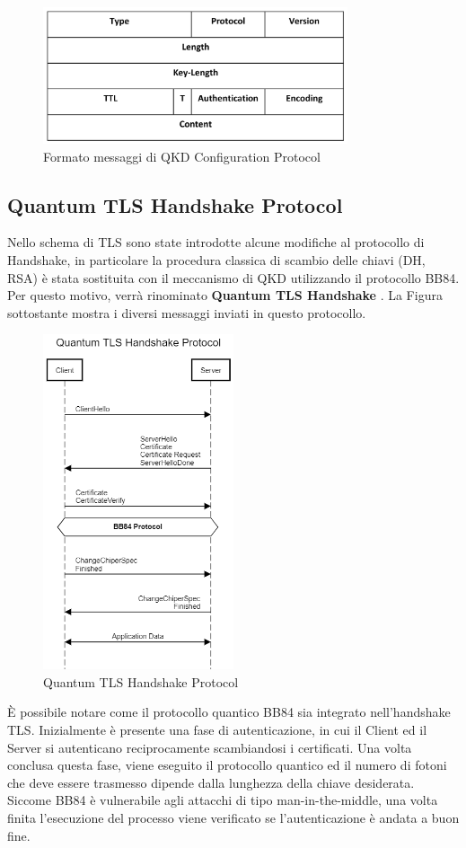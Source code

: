 \begin{figure}[H]
    \centering
    \includegraphics[width=0.8\textwidth]{MainContent/img/cap3/QKD Configuration Protocol.png}
    \caption{Formato messaggi di QKD Configuration Protocol}
    \label{fig:QKD_conf}
\end{figure}

\subsection{Quantum TLS Handshake Protocol}
Nello schema di TLS sono state introdotte alcune modifiche al protocollo di Handshake, in particolare la procedura classica di scambio delle chiavi (DH, RSA) è stata sostituita con il meccanismo di QKD utilizzando il protocollo BB84. Per questo motivo, verrà rinominato \textbf{Quantum TLS Handshake} . La Figura sottostante mostra i diversi messaggi inviati in questo protocollo.
\begin{figure}[H]
    \centering
    \includegraphics[width=0.5\textwidth]{MainContent/img/cap3/BB84diagram.png}
    \caption{Quantum TLS Handshake Protocol}
    \label{fig:QTLSHP}
\end{figure}
\noindent È possibile notare come il protocollo quantico BB84 sia integrato nell'handshake TLS. Inizialmente è presente una fase di autenticazione, in cui il Client ed il Server si autenticano reciprocamente scambiandosi i certificati. Una volta conclusa questa fase, viene eseguito il protocollo quantico ed il numero di fotoni che deve essere trasmesso dipende dalla lunghezza della chiave desiderata. Siccome BB84 è vulnerabile agli attacchi di tipo man-in-the-middle, una volta finita l’esecuzione del processo viene verificato se l’autenticazione è andata a buon fine.
\newpage

